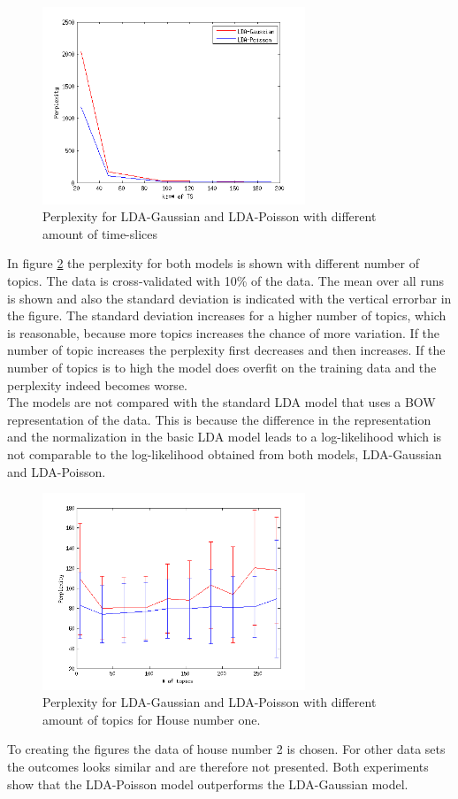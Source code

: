 \begin{figure}[h!]
 \centering
  \includegraphics[width=0.7\textwidth]{Pictures/CompareTSgausPois.png}
  \caption{Perplexity for LDA-Gaussian and LDA-Poisson with different amount of time-slices}
  \label{fig:CompareTS}
\end{figure}

In figure \ref{fig:CompareK} the perplexity for both models is shown with different number of topics. The data is cross-validated with 10\% of the data. The mean over all runs is shown and also the standard deviation is indicated with the vertical errorbar in the figure. The standard deviation increases for a higher number of topics, which is reasonable, because more topics increases the chance of more variation. If the number of topic increases the perplexity first decreases and then increases. If the number of topics is to high the model does overfit on the training data and the perplexity indeed becomes worse.\\

The models are not compared with the standard LDA model that uses a BOW representation of the data.
This is because the difference in the representation and the normalization in the basic LDA model leads to a log-likelihood which is not comparable to the log-likelihood obtained from both models, LDA-Gaussian and LDA-Poisson.


 \begin{figure}[h!]
  \centering
  \includegraphics[width=0.7\textwidth]{Pictures/CompareCrossTops.png}
\caption{Perplexity for LDA-Gaussian and LDA-Poisson with different amount of topics for House number one.}
  \label{fig:CompareK}
 \end{figure}


To creating the figures the data of house number 2 is chosen. For other data sets the outcomes looks similar and are therefore not presented. Both experiments show that the LDA-Poisson model outperforms the LDA-Gaussian model.
 
